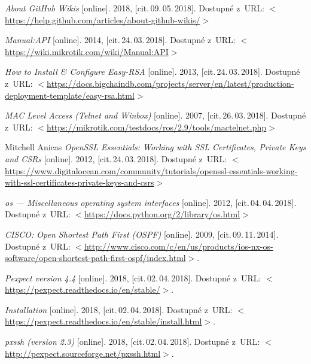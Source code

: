 \begin{literatura}{99}

      \emph{About GitHub Wikis}\/ [online].
    2018,  [cit.\,09.\,05.\,2018].
    Dostupné z~URL:
    \(<\)\url{https://help.github.com/articles/about-github-wikis/}\(>\)			

      \emph{Manual:API}\/ [online].
    2014,  [cit.\,24.\,03.\,2018].
    Dostupné z~URL:
    \(<\)\url{https://wiki.mikrotik.com/wiki/Manual:API}\(>\)			
    
      \emph{How to Install & Configure Easy-RSA}\/ [online].
    2013,  [cit.\,24.\,03.\,2018].
    Dostupné z~URL:
    \(<\)\url{https://docs.bigchaindb.com/projects/server/en/latest/production-deployment-template/easy-rsa.html}\(>\)

      \emph{MAC Level Access (Telnet and Winbox)}\/ [online].
    2007,  [cit.\,26.\,03.\,2018].
    Dostupné z~URL:
    \(<\)\url{https://mikrotik.com/testdocs/ros/2.9/tools/mactelnet.php}\(>\)

     Mitchell Anicas \emph{OpenSSL Essentials: Working with SSL Certificates, Private Keys and CSRs}\/ [online].
    2012,  [cit.\,24.\,03.\,2018].
    Dostupné z~URL:
    \(<\)\url{https://www.digitalocean.com/community/tutorials/openssl-essentials-working-with-ssl-certificates-private-keys-and-csrs}\(>\)		

      \emph{os — Miscellaneous operating system interfaces}\/ [online].
    2012,  [cit.\,04.\,04.\,2018].
    Dostupné z~URL:
    \(<\)\url{https://docs.python.org/2/library/os.html}\(>\)		

    \emph{CISCO: Open Shortest Path First (OSPF)}\/ [online].
    2009,  [cit.\,09.\,11.\,2014].
    Dostupné z~URL:
    \(<\)\url{http://www.cisco.com/c/en/us/products/ios-nx-os-software/open-shortest-path-first-ospf/index.html}\(>\).	

    \emph{Pexpect version 4.4}\/ [online].
    2018,  [cit.\,02.\,04.\,2018].
    Dostupné z~URL:
    \(<\)\url{https://pexpect.readthedocs.io/en/stable/}\(>\).	
    
    \emph{Installation}\/ [online].
    2018,  [cit.\,02.\,04.\,2018].
    Dostupné z~URL:
    \(<\)\url{https://pexpect.readthedocs.io/en/stable/install.html}\(>\).	
    
    \emph{pxssh (version 2.3)}\/ [online].
    2018,  [cit.\,02.\,04.\,2018].
    Dostupné z~URL:
    \(<\)\url{http://pexpect.sourceforge.net/pxssh.html}\(>\).


\end{literatura}

